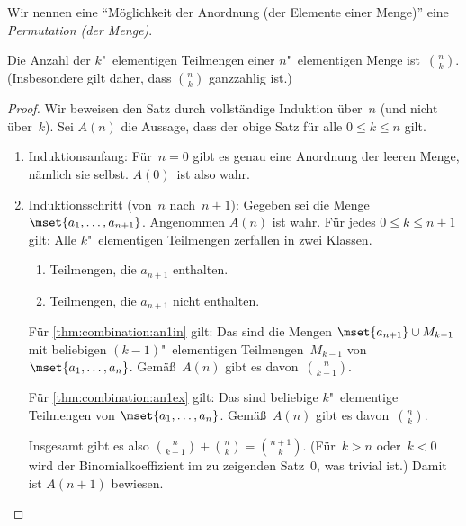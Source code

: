 \documentclass[a4paper]{article}
\begin{document}
\begin{notation}
    Wir nennen eine "`Möglichkeit der Anordnung (der Elemente einer Menge)"' eine \emph{Permutation (der Menge)}.
\end{notation}

\begin{theorem}[Kombination]
    Die Anzahl der $k$"~elementigen Teilmengen einer $n$"~elementigen Menge ist~$\binom{n}{k}$. (Insbesondere gilt daher, dass $\binom{n}{k}$ ganzzahlig ist.)
\end{theorem}

\begin{proof}
    Wir beweisen den Satz durch vollständige Induktion über~$n$ (und nicht über~$k$). Sei $A(n)$ die Aussage, dass der obige Satz für alle $0 \leq k \leq n$ gilt.

    \begin{enumerate}
        \item Induktionsanfang: Für~$n = 0$ gibt es genau eine Anordnung der leeren Menge, nämlich sie selbst. $A(0)$~ist also wahr.
        \item Induktionsschritt (von~$n$ nach~$n + 1$): Gegeben sei die Menge~$\mset{a_1, \dots, a_{n+1}}$. Angenommen $A(n)$ ist wahr. Für jedes $0 \leq k \leq n+1$ gilt: Alle $k$"~elementigen Teilmengen zerfallen in zwei Klassen.
              \begin{enumerate}
                  \item Teilmengen, die $a_{n+1}$ enthalten.\label{thm:combination:an1in}
                  \item Teilmengen, die $a_{n+1}$ nicht enthalten.\label{thm:combination:an1ex}
              \end{enumerate}

              Für \cref{thm:combination:an1in} gilt: Das sind die Mengen $\mset{a_{n + 1}} \cup M_{k - 1}$ mit beliebigen $(k - 1)$"~elementigen Teilmengen~$M_{k - 1}$ von $\mset{a_1, \dots, a_n}$. Gemäß~$A(n)$ gibt es davon~$\binom{n}{k - 1}$.

              Für \cref{thm:combination:an1ex} gilt: Das sind beliebige $k$"~elementige Teilmengen von $\mset{a_1, \dots, a_n}$. Gemäß~$A(n)$ gibt es davon~$\binom{n}{k}$.

              Insgesamt gibt es also $\binom{n}{k - 1} + \binom{n}{k} = \binom{n + 1}{k}$. (Für~$k > n$ oder~$k < 0$ wird der Binomialkoeffizient im zu zeigenden Satz~0, was trivial ist.) Damit ist $A(n + 1)$ bewiesen.\qedhere
    \end{enumerate}
\end{proof}
\end{document}
